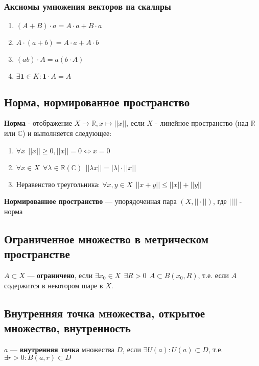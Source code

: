 \subsubsection{Аксиомы умножения векторов на скаляры}
\begin{enumerate}\itemsep0em
    \item $(A+B)\cdot a = A\cdot a + B\cdot a$
    \item $A\cdot(a+b) = A\cdot a + A\cdot b$
    \item $(ab)\cdot A = a(b\cdot A)$
    \item $\exists \bm 1 \in K : \bm 1 \cdot A = A$
\end{enumerate}

\subsection{Норма, нормированное пространство}

\textbf{Норма} - отображение $X\to\mathbb{R}, x\mapsto ||x||$, если $X$ - линейное пространство (над $\mathbb{R}$ или $\mathbb{C}$) и выполняется следующее:
\begin{enumerate}
\item $\forall x \ \ ||x||\geq 0, ||x||=0\Leftrightarrow x=0$
\item $\forall x\in X \ \ \forall \lambda\in\mathbb R(\mathbb{C}) \ \ ||\lambda x||=|\lambda|\cdot||x||$
\item Неравенство треугольника: $\forall x,y\in X \ \ ||x+y||\leq||x||+||y||$
\end{enumerate}

\textbf{Нормированное пространство} --- упорядоченная пара $(X, ||\cdot||)$, где $|| ||$ - норма

\subsection{Ограниченное множество в метрическом пространстве}

$A\subset X$ --- {\bf ограничено}, если $\exists x_0\in X \ \ \exists R>0 \ \ A\subset B(x_0, R)$, т.е. если $A$ содержится в некотором шаре в $X$.

\subsection{Внутренняя точка множества, открытое множество, внутренность}

$a$ --- {\bf внутренняя точка} множества $D$, если $\exists U(a) : U(a)\subset D$, т.е. $\exists r>0 : B(a,r)\subset D$

